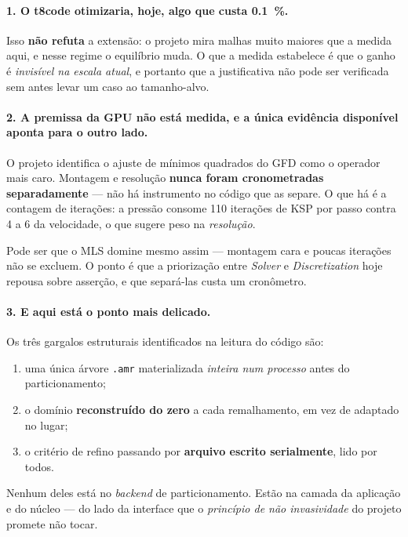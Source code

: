 \paragraph{1. O t8code otimizaria, hoje, algo que custa \SI{0.1}{\percent}.}
Isso \textbf{n\~ao refuta} a extens\~ao: o projeto mira malhas muito maiores que
a medida aqui, e nesse regime o equil\'ibrio muda. O que a medida estabelece \'e
que o ganho \'e \emph{invis\'ivel na escala atual}, e portanto que a
justificativa n\~ao pode ser verificada sem antes levar um caso ao tamanho-alvo.

\paragraph{2. A premissa da GPU n\~ao est\'a medida, e a \'unica evid\^encia
dispon\'ivel aponta para o outro lado.} O projeto identifica o ajuste de m\'inimos
quadrados do GFD como o operador mais caro. Montagem e resolu\c{c}\~ao
\textbf{nunca foram cronometradas separadamente} --- n\~ao h\'a instrumento no
c\'odigo que as separe. O que h\'a \'e a contagem de itera\c{c}\~oes: a press\~ao
consome 110 itera\c{c}\~oes de KSP por passo contra 4 a 6 da velocidade, o que
sugere peso na \emph{resolu\c{c}\~ao}.

Pode ser que o MLS domine mesmo assim --- montagem cara e poucas
itera\c{c}\~oes n\~ao se excluem. O ponto \'e que a prioriza\c{c}\~ao entre
\emph{Solver} e \emph{Discretization} hoje repousa sobre asser\c{c}\~ao, e que
separ\'a-las custa um cron\^ometro.

\paragraph{3. E aqui est\'a o ponto mais delicado.} Os tr\^es gargalos
estruturais identificados na leitura do c\'odigo s\~ao:

\begin{enumerate}
  \item uma \'unica \'arvore \texttt{.amr} materializada \emph{inteira num
    processo} antes do particionamento;
  \item o dom\'inio \textbf{reconstru\'ido do zero} a cada remalhamento, em vez de
    adaptado no lugar;
  \item o crit\'erio de refino passando por \textbf{arquivo escrito
    serialmente}, lido por todos.
\end{enumerate}

Nenhum deles est\'a no \emph{backend} de particionamento. Est\~ao na camada da
aplica\c{c}\~ao e do n\'ucleo --- do lado da interface que o \emph{princ\'ipio de
n\~ao invasividade} do projeto promete n\~ao tocar.

